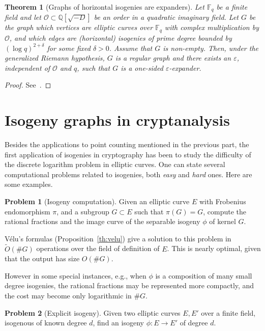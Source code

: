 \documentclass[10pt]{article}
\theoremstyle{plain}
\newtheorem{theorem}{Theorem}
\theoremstyle{definition}
\newtheorem{problem}{Problem}
\def\F{\ensuremath{\mathbb{F}}}
\def\O{\ensuremath{\mathcal{O}}}
\def\tildO{\ensuremath{\tilde{O}}}
\begin{document}
\begin{theorem}[Graphs of horizontal isogenies are expanders]
  \label{th:ord-exp}
  Let $\F_q$ be a finite field and let $\O⊂ℚ[\sqrt{-D}]$ be an order
  in a quadratic imaginary field. %
  Let $G$ be the graph which vertices are elliptic curves over $\F_q$
  with complex multiplication by $\O$, and which edges are
  (horizontal) isogenies of prime degree bounded by $(\log q)^{2+δ}$
  for some fixed $δ>0$. %
  Assume that $G$ is non-empty. %
  Then, under the generalized Riemann hypothesis, $G$ is a regular
  graph and there exists an $ε$, independent of $\O$ and $q$, such
  that $G$ is a one-sided $ε$-expander.
\end{theorem}
\begin{proof}
  See~\cite{JMV}.
\end{proof}

\section{Isogeny graphs in cryptanalysis}
\label{sec:isog-graphs-crypt}

Besides the applications to point counting mentioned in the previous
part, the first application of isogenies in cryptography has been to
study the difficulty of the discrete logarithm problem in elliptic
curves. %
One can state several computational problems related to isogenies,
both \emph{easy} and \emph{hard} ones. %
Here are some examples.

\begin{problem}[Isogeny computation]
  Given an elliptic curve $E$ with Frobenius endomorphism $π$, and a
  subgroup $G⊂E$ such that $π(G)=G$, compute the rational fractions
  and the image curve of the separable isogeny $ϕ$ of kernel $G$.
\end{problem}

V\'elu's formulas (Proposition~\ref{th:velu}) give a solution to this
problem in $\tildO(\#G)$ operations over the field of definition of
$E$. %
This is nearly optimal, given that the output has size $O(\#G)$.
  
However in some special instances, e.g., when $ϕ$ is a composition of
many small degree isogenies, the rational fractions may be represented
more compactly, and the cost may become only logarithmic in $\#G$.

\begin{problem}[Explicit isogeny]
  \label{prob:explicit-isog}
  Given two elliptic curves $E,E'$ over a finite field, isogenous
  of known degree $d$, find an isogeny $ϕ:E\to E'$ of degree $d$.
\end{problem}
\end{document}
